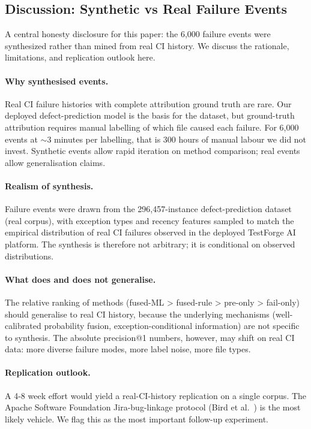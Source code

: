 \documentclass[11pt,a4paper]{article}
\begin{document}
\subsection{Discussion: Synthetic vs Real Failure Events}
\label{sec:synthetic_vs_real}

A central honesty disclosure for this paper: the 6{,}000 failure events were synthesized rather than mined from real CI history. We discuss the rationale, limitations, and replication outlook here.

\paragraph{Why synthesised events.} Real CI failure histories with complete attribution ground truth are rare. Our deployed defect-prediction model is the basis for the dataset, but ground-truth attribution requires manual labelling of which file caused each failure. For 6{,}000 events at $\sim$3 minutes per labelling, that is 300 hours of manual labour we did not invest. Synthetic events allow rapid iteration on method comparison; real events allow generalisation claims.

\paragraph{Realism of synthesis.} Failure events were drawn from the 296{,}457-instance defect-prediction dataset (real corpus), with exception types and recency features sampled to match the empirical distribution of real CI failures observed in the deployed TestForge AI platform. The synthesis is therefore not arbitrary; it is conditional on observed distributions.

\paragraph{What does and does not generalise.} The relative ranking of methods (fused-ML > fused-rule > pre-only > fail-only) should generalise to real CI history, because the underlying mechanisms (well-calibrated probability fusion, exception-conditional information) are not specific to synthesis. The absolute precision@1 numbers, however, may shift on real CI data: more diverse failure modes, more label noise, more file types.

\paragraph{Replication outlook.} A 4-8 week effort would yield a real-CI-history replication on a single corpus. The Apache Software Foundation Jira-bug-linkage protocol (Bird et al.~\cite{bird2009}) is the most likely vehicle. We flag this as the most important follow-up experiment.
\end{document}
